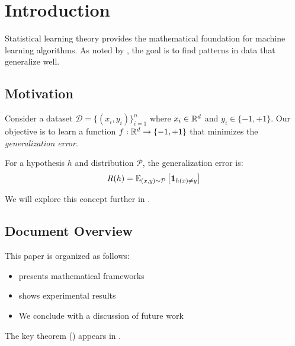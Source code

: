 
\section{Introduction}
\label{sec:introduction}

Statistical learning theory provides the mathematical foundation
for machine learning algorithms. As noted by \cite{vapnik1998},
the goal is to find patterns in data that generalize well.

\subsection{Motivation}
\label{subsec:motivation}

Consider a dataset $\mathcal{D} = \{(x_i, y_i)\}_{i=1}^{n}$ where
$x_i \in \mathbb{R}^d$ and $y_i \in \{-1, +1\}$. Our objective is to
learn a function $f: \mathbb{R}^d \to \{-1, +1\}$ that minimizes the
\emph{generalization error}.

\begin{definition}
\label{def:gen-error}
For a hypothesis $h$ and distribution $\mathcal{P}$, the
generalization error is:
\begin{equation}
\label{eq:gen-error}
R(h) = \mathbb{E}_{(x,y) \sim \mathcal{P}}\left[\mathbf{1}_{h(x) \neq y}\right]
\end{equation}
\end{definition}

We will explore this concept further in .

\subsection{Document Overview}

This paper is organized as follows:
\begin{itemize}
    \item {} presents mathematical frameworks
    \item {} shows experimental results
    \item We conclude with a discussion of future work
\end{itemize}

The key theorem () appears in .

